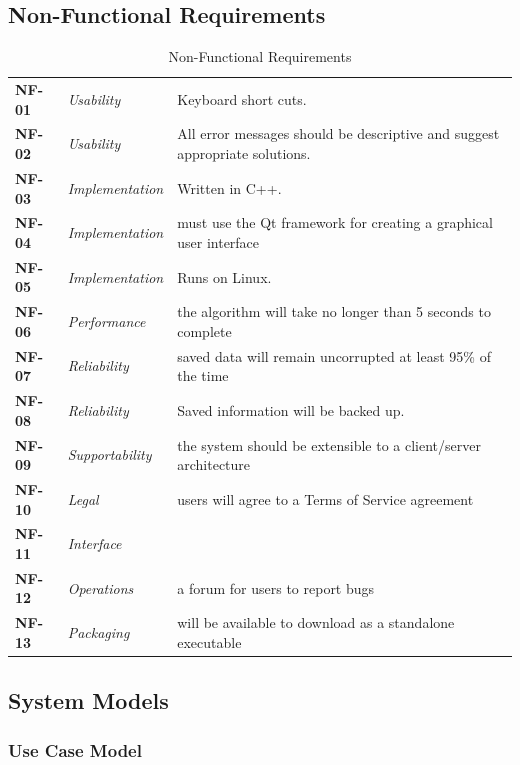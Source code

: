 \documentclass[12pt,letterpaper]{article}
\begin{document}
\subsection{Non-Functional Requirements}

\begin{table}[H]
\caption{Non-Functional Requirements}
\renewcommand{\arraystretch}{1.5}
\everyrow{\hline}
\begin{tabu} to 
NF-01 & Usability & Keyboard short cuts. \\
NF-02 & Usability & All error messages should be descriptive and suggest appropriate solutions.\\
NF-03 & Implementation & Written in C++. \\
NF-04 & Implementation & must use the Qt framework for creating a graphical user interface \\
NF-05 & Implementation & Runs on Linux. \\
NF-06 & Performance & the algorithm will take no longer than 5 seconds to complete \\
NF-07 & Reliability & saved data will remain uncorrupted at least 95\% of the time \\
NF-08 & Reliability & Saved information will be backed up. \\
NF-09 & Supportability & the system should be extensible to a client/server architecture \\
NF-10 & Legal & users will agree to a Terms of Service agreement \\
NF-11 & Interface & \\
NF-12 & Operations & a forum for users to report bugs \\
NF-13 & Packaging & will be available to download as a standalone executable \\
\end{tabu}
\end{table}

\subsection{System Models}

\subsubsection{Use Case Model}
\end{document}
